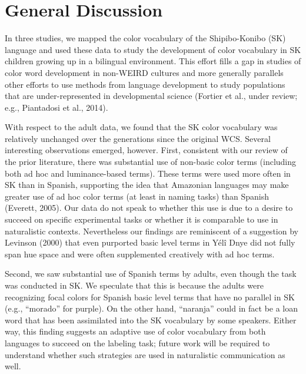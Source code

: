 \documentclass[
  english,
  ,apa7,floatsintext]{apa6}
\begin{document}
\hypertarget{general-discussion}{%
\section{General Discussion}\label{general-discussion}}

In three studies, we mapped the color vocabulary of the Shipibo-Konibo (SK) language and used these data to study the development of color vocabulary in SK children growing up in a bilingual environment. This effort fills a gap in studies of color word development in non-WEIRD cultures and more generally parallels other efforts to use methods from language development to study populations that are under-represented in developmental science (Fortier et al., under review; e.g., Piantadosi et al., 2014).

With respect to the adult data, we found that the SK color vocabulary was relatively unchanged over the generations since the original WCS. Several interesting observations emerged, however. First, consistent with our review of the prior literature, there was substantial use of non-basic color terms (including both ad hoc and luminance-based terms). These terms were used more often in SK than in Spanish, supporting the idea that Amazonian languages may make greater use of ad hoc color terms (at least in naming tasks) than Spanish (Everett, 2005). Our data do not speak to whether this use is due to a desire to succeed on specific experimental tasks or whether it is comparable to use in naturalistic contexts. Nevertheless our findings are reminiscent of a suggestion by Levinson (2000) that even purported basic level terms in Yélî Dnye did not fully span hue space and were often supplemented creatively with ad hoc terms.

Second, we saw substantial use of Spanish terms by adults, even though the task was conducted in SK. We speculate that this is because the adults were recognizing focal colors for Spanish basic level terms that have no parallel in SK (e.g., ``morado'' for purple). On the other hand, ``naranja'' could in fact be a loan word that has been assimilated into the SK vocabulary by some speakers. Either way, this finding suggests an adaptive use of color vocabulary from both languages to succeed on the labeling task; future work will be required to understand whether such strategies are used in naturalistic communication as well.
\end{document}
